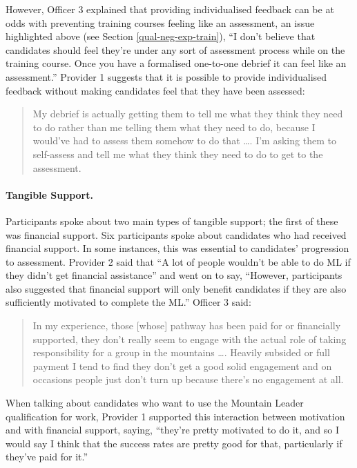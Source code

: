 \documentclass[
  12pt,
  a4paper,
]{book}
\begin{document}
However, Officer 3 explained that providing individualised feedback can be at odds with preventing training courses feeling like an assessment, an issue highlighted above (see Section \ref{qual-neg-exp-train}), ``I don't believe that candidates should feel they're under any sort of assessment process while on the training course. Once you have a formalised one-to-one debrief it can feel like an assessment.'' Provider 1 suggests that it is possible to provide individualised feedback without making candidates feel that they have been assessed:

\begin{quote}
My debrief is actually getting them to tell me what they think they need to do rather than me telling them what they need to do, because I would've had to assess them somehow to do that \ldots. I'm asking them to self-assess and tell me what they think they need to do to get to the assessment.
\end{quote}

\hypertarget{tangible-support.}{%
\paragraph{Tangible Support.}\label{tangible-support.}}

Participants spoke about two main types of tangible support; the first of these was financial support. Six participants spoke about candidates who had received financial support. In some instances, this was essential to candidates' progression to assessment. Provider 2 said that ``A lot of people wouldn't be able to do ML if they didn't get financial assistance'' and went on to say, ``However, participants also suggested that financial support will only benefit candidates if they are also sufficiently motivated to complete the ML.'' Officer 3 said:

\begin{quote}
In my experience, those {[}whose{]} pathway has been paid for or financially supported, they don't really seem to engage with the actual role of taking responsibility for a group in the mountains \ldots. Heavily subsided or full payment I tend to find they don't get a good solid engagement and on occasions people just don't turn up because there's no engagement at all.
\end{quote}

When talking about candidates who want to use the Mountain Leader qualification for work, Provider 1 supported this interaction between motivation and with financial support, saying, ``they're pretty motivated to do it, and so I would say I think that the success rates are pretty good for that, particularly if they've paid for it.''
\end{document}
